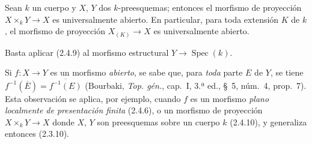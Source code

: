 \begin{corollary}[2.4.10]
\label{IV.2.4.10-fr}
Sean $k$ un cuerpo y $X$, $Y$ dos $k$-preesquemas; entonces el morfismo de
proyección $X\times_k Y\to X$ es universalmente abierto. En particular,
para toda extensión $K$ de $k$, el morfismo de proyección $X_{(K)}\to X$ es
universalmente abierto.
\end{corollary}

Basta aplicar (2.4.9) al morfismo estructural
$Y\to\operatorname{Spec}(k)$.

\begin{remark}[2.4.11]
\label{IV.2.4.11-fr}
Si $f:X\to Y$ es un morfismo \emph{abierto}, se sabe que, para \emph{toda} parte
$E$ de $Y$, se tiene
$f^{-1}(\overline E)=\overline{f^{-1}(E)}$
(Bourbaki, \emph{Top. gén.}, cap.~I, 3.ª ed., \S~5,
núm.~4, prop.~7). Esta observación se aplica, por ejemplo,
cuando $f$ es un morfismo \emph{plano localmente de presentación finita}
(2.4.6), o un morfismo de proyección $X\times_k Y\to X$ donde $X$, $Y$ son
preesquemas sobre un cuerpo $k$ (2.4.10), y generaliza entonces (2.3.10).
\end{remark}
